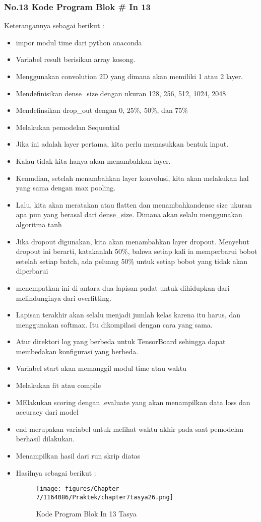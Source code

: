 \subsubsection{No.13 Kode Program Blok \# In 13}

Keterangannya sebagai berikut :
\begin{itemize}
\item impor modul time dari python anaconda
\item Variabel result berisikan array kosong.
\item Menggunakan convolution 2D yang dimana akan memiliki 1 atau 2 layer.
\item Mendefinisikan dense\_size dengan ukuran 128, 256, 512, 1024, 2048
\item Mendefinsikan drop\_out dengan 0, 25\%, 50\%, dan 75\%
\item Melakukan pemodelan Sequential
\item Jika ini adalah layer pertama, kita perlu memasukkan bentuk input.
\item Kalau tidak kita hanya akan menambahkan layer.
\item Kemudian, setelah menambahkan layer konvolusi, kita akan melakukan hal yang sama dengan max pooling.
\item  Lalu, kita akan meratakan atau flatten dan menambahkandense size ukuran apa pun yang berasal dari dense\_size. Dimana akan selalu menggunakan algoritma tanh
\item Jika dropout digunakan, kita akan menambahkan layer dropout. Menyebut dropout ini berarti, katakanlah 50\%, bahwa setiap kali ia memperbarui bobot setelah setiap batch, ada peluang 50\% untuk setiap bobot yang tidak akan diperbarui
\item menempatkan ini di antara dua lapisan padat untuk dihidupkan dari melindunginya dari overfitting.
\item  Lapisan terakhir akan selalu menjadi jumlah kelas karena itu harus, dan menggunakan softmax. Itu dikompilasi dengan cara yang sama.
\item Atur direktori log yang berbeda untuk TensorBoard sehingga dapat membedakan konfigurasi yang berbeda.
\item Variabel start akan memanggil modul time atau waktu
\item Melakukan fit atau compile 
\item MElakukan scoring dengan .evaluate yang akan menampilkan data loss dan accuracy dari model
\item end merupakan variabel untuk melihat waktu akhir pada saat pemodelan berhasil dilakukan.
\item Menampilkan hasil dari run skrip diatas
\item Hasilnya sebagai berikut :
\begin{figure}[ht]
\centering
\texttt{[image: figures/Chapter 7/1164086/Praktek/chapter7tasya26.png]}
\caption{Kode Program Blok In 13 Tasya}
\label{Praktek}
\end{figure}
\end{itemize} 

